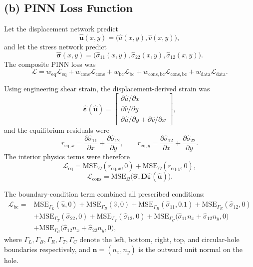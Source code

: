 \documentclass[11pt]{article}
\begin{document}
\subsection*{(b) PINN Loss Function}

Let the displacement network predict
\[
\hat{\mathbf{u}}(x,y) = \big(\hat{u}(x,y), \hat{v}(x,y)\big),
\]
and let the stress network predict
\[
\hat{\boldsymbol{\sigma}}(x,y) = \big(\hat{\sigma}_{11}(x,y), \hat{\sigma}_{22}(x,y), \hat{\sigma}_{12}(x,y)\big).
\]
The composite PINN loss was
\[
\mathcal{L}
=
w_{\mathrm{eq}} \mathcal{L}_{\mathrm{eq}}
+ w_{\mathrm{cons}} \mathcal{L}_{\mathrm{cons}}
+ w_{\mathrm{bc}} \mathcal{L}_{\mathrm{bc}}
+ w_{\mathrm{cons,bc}} \mathcal{L}_{\mathrm{cons,bc}}
+ w_{\mathrm{data}} \mathcal{L}_{\mathrm{data}}.
\]

Using engineering shear strain, the displacement-derived strain was
\[
\hat{\boldsymbol{\varepsilon}}(\hat{\mathbf{u}})
=
\begin{bmatrix}
\partial \hat{u}/\partial x \\
\partial \hat{v}/\partial y \\
\partial \hat{u}/\partial y + \partial \hat{v}/\partial x
\end{bmatrix},
\]
and the equilibrium residuals were
\[
r_{\mathrm{eq},x} = \frac{\partial \hat{\sigma}_{11}}{\partial x} + \frac{\partial \hat{\sigma}_{12}}{\partial y},
\qquad
r_{\mathrm{eq},y} = \frac{\partial \hat{\sigma}_{12}}{\partial x} + \frac{\partial \hat{\sigma}_{22}}{\partial y}.
\]
The interior physics terms were therefore
\[
\mathcal{L}_{\mathrm{eq}}
=
\mathrm{MSE}_{\Omega}(r_{\mathrm{eq},x},0)
+
\mathrm{MSE}_{\Omega}(r_{\mathrm{eq},y},0),
\]
\[
\mathcal{L}_{\mathrm{cons}}
=
\mathrm{MSE}_{\Omega}\!\big(\hat{\boldsymbol{\sigma}}, \mathbf{D}\hat{\boldsymbol{\varepsilon}}(\hat{\mathbf{u}})\big).
\]

The boundary-condition term combined all prescribed conditions:
\[
\begin{aligned}
\mathcal{L}_{\mathrm{bc}} = {} &
\mathrm{MSE}_{\Gamma_L}(\hat{u},0)
+ \mathrm{MSE}_{\Gamma_B}(\hat{v},0)
+ \mathrm{MSE}_{\Gamma_R}(\hat{\sigma}_{11},0.1)
+ \mathrm{MSE}_{\Gamma_R}(\hat{\sigma}_{12},0) \\
&+ \mathrm{MSE}_{\Gamma_T}(\hat{\sigma}_{22},0)
+ \mathrm{MSE}_{\Gamma_T}(\hat{\sigma}_{12},0)
+ \mathrm{MSE}_{\Gamma_C}\!\big(\hat{\sigma}_{11}n_x+\hat{\sigma}_{12}n_y,0\big) \\
&+ \mathrm{MSE}_{\Gamma_C}\!\big(\hat{\sigma}_{12}n_x+\hat{\sigma}_{22}n_y,0\big),
\end{aligned}
\]
where \(\Gamma_L,\Gamma_B,\Gamma_R,\Gamma_T,\Gamma_C\) denote the left, bottom, right, top, and circular-hole boundaries respectively, and \(\mathbf{n}=(n_x,n_y)\) is the outward unit normal on the hole.
\end{document}
